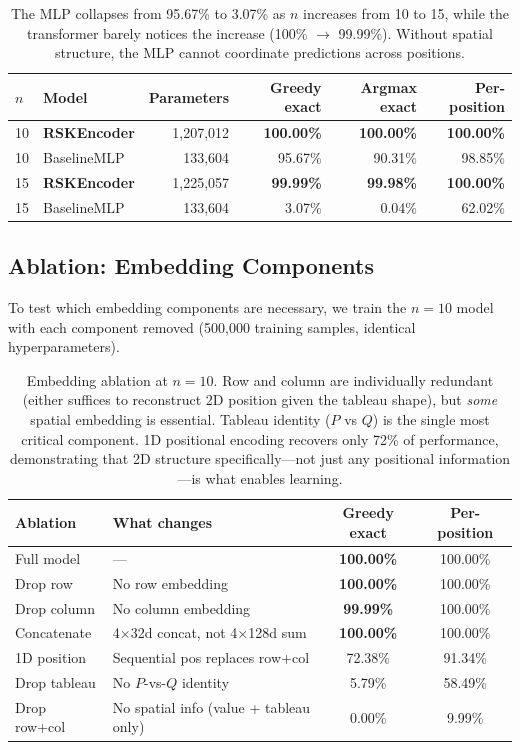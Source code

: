 \documentclass[11pt,a4paper]{article}
\begin{document}
\begin{table}[h]
\centering
\begin{tabular}{llrrrr}
\toprule
$n$ & Model & Parameters & Greedy exact & Argmax exact & Per-position \\
\midrule
10 & \textbf{RSKEncoder} & 1,207,012 & \textbf{100.00\%} & \textbf{100.00\%} & \textbf{100.00\%} \\
10 & BaselineMLP & 133,604 & 95.67\% & 90.31\% & 98.85\% \\
\midrule
15 & \textbf{RSKEncoder} & 1,225,057 & \textbf{99.99\%} & \textbf{99.98\%} & \textbf{100.00\%} \\
15 & BaselineMLP & 133,604 & 3.07\% & 0.04\% & 62.02\% \\
\bottomrule
\end{tabular}
\caption{The MLP collapses from 95.67\% to 3.07\% as $n$ increases from 10 to 15, while the transformer barely notices the increase (100\% $\to$ 99.99\%). Without spatial structure, the MLP cannot coordinate predictions across positions.}
\end{table}

\subsection{Ablation: Embedding Components}

To test which embedding components are necessary, we train the $n{=}10$ model with each component removed (500{,}000 training samples, identical hyperparameters).

\begin{table}[h]
\centering
\begin{tabular}{llcc}
\toprule
Ablation & What changes & Greedy exact & Per-position \\
\midrule
Full model & --- & \textbf{100.00\%} & 100.00\% \\
Drop row & No row embedding & \textbf{100.00\%} & 100.00\% \\
Drop column & No column embedding & \textbf{99.99\%} & 100.00\% \\
Concatenate & 4$\times$32d concat, not 4$\times$128d sum & \textbf{100.00\%} & 100.00\% \\
\midrule
1D position & Sequential pos replaces row+col & 72.38\% & 91.34\% \\
Drop tableau & No $P$-vs-$Q$ identity & 5.79\% & 58.49\% \\
Drop row+col & No spatial info (value + tableau only) & 0.00\% & 9.99\% \\
\bottomrule
\end{tabular}
\caption{Embedding ablation at $n{=}10$. Row and column are individually redundant (either suffices to reconstruct 2D position given the tableau shape), but \emph{some} spatial embedding is essential. Tableau identity ($P$ vs $Q$) is the single most critical component. 1D positional encoding recovers only 72\% of performance, demonstrating that 2D structure specifically---not just any positional information---is what enables learning.}
\end{table}
\end{document}
